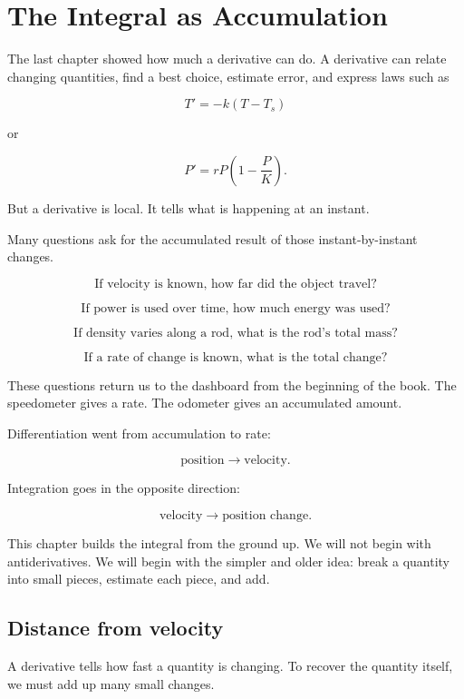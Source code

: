 
\chapter{The Integral as Accumulation}
\label{chap:integral-as-accumulation}

The last chapter showed how much a derivative can do.  A derivative can relate
changing quantities, find a best choice, estimate error, and express laws such as

\[
T'=-k(T-T_s)
\]

or

\[
P'=rP\left(1-\frac{P}{K}\right).
\]

But a derivative is local.  It tells what is happening at an instant.

Many questions ask for the accumulated result of those instant-by-instant changes.

\[
\text{If velocity is known, how far did the object travel?}
\]

\[
\text{If power is used over time, how much energy was used?}
\]

\[
\text{If density varies along a rod, what is the rod's total mass?}
\]

\[
\text{If a rate of change is known, what is the total change?}
\]

These questions return us to the dashboard from the beginning of the book.  The
speedometer gives a rate.  The odometer gives an accumulated amount.

Differentiation went from accumulation to rate:

\[
\text{position} \longrightarrow \text{velocity}.
\]

Integration goes in the opposite direction:

\[
\text{velocity} \longrightarrow \text{position change}.
\]

This chapter builds the integral from the ground up.  We will not begin with
antiderivatives.  We will begin with the simpler and older idea: break a quantity into
small pieces, estimate each piece, and add.

\section{Distance from velocity}
\label{sec:distance-from-velocity}

A derivative tells how fast a quantity is changing.  To recover the quantity itself, we
must add up many small changes.

